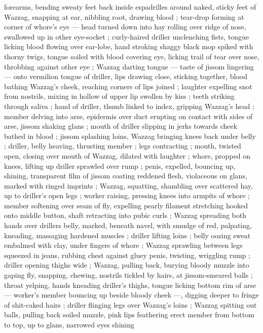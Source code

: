 forearms, bending sweaty feet back inside espadrilles around naked, sticky feet of Wazzag, snapping at ear, nibbling root, drawing blood ; tear-drop forming at corner of whore's eye --- head turned down into hay {\dashcom} rolling over ridge of nose, swallowed up in other eye-socket ; curly-haired driller unclenching fists, tongue licking blood flowing over ear-lobe, hand stroking shaggy black mop spiked with thorny twigs, tongue soiled with blood covering eye, licking trail of tear over nose, throbbing against other eye ; Wazzag darting tongue --- taste of jissom lingering --- onto vermilion tongue of driller, lips drawing close, sticking together, blood bathing Wazzag's cheek, reaching corners of lips joined ; laughter expelling snot from nostrils, mixing in hollow of upper lip swollen by kiss ; teeth striking through saliva ; hand of driller, thumb linked to index, gripping Wazzag's head ; member delving into arse, epidermis over duct erupting on contact with sides of arse, jissom shaking glans ; mouth of driller slipping in jerks towards cheek bathed in blood ; jissom splashing loins, Wazzag bringing knees back under belly ; driller, belly heaving, thrusting member ; legs contracting ; mouth, twisted open, closing over mouth of Wazzag, dilated with laughter ; whore, propped on knees, lifting up driller sprawled over rump ; penis, expelled, bouncing up, shining, transparent film of jissom coating reddened flesh, violaceous on glans, marked with ringed imprints ; Wazzag, squatting, shambling over scattered hay, up to driller's open legs ; worker raising, pressing knees into armpits of whore ; member softening over seam of fly, expelling pearly filament stretching hooked onto middle button, shaft retracting into pubic curls ; Wazzag spreading both hands over drillers belly, marked, beneath navel, with smudge of red, palpating, kneading, massaging hardened muscles ; driller lifting loins ; belly oozing sweat embalmed with clay, under fingers of whore ; Wazzag sprawling between legs squeezed in jeans, rubbing chest against gluey penis, twisting, wriggling rump ; driller opening thighs wide ; Wazzag, pulling back, burying bloody muzzle into gaping fly, snapping, chewing, nostrils tickled by hairs, at jissom-smeared balls ; throat yelping, hands kneading driller's 
thighs, tongue licking bottom rim of arse --- worker's member 
bouncing up beside bloody cheek ---, digging deeper to fringe of 
shit-caked hairs ; driller flinging legs over Wazzag's loins ; Wazzag 
spitting out balls, pulling back soiled muzzle, pink lips feathering 
erect member from bottom to top, up to glans, narrowed eyes shining 
